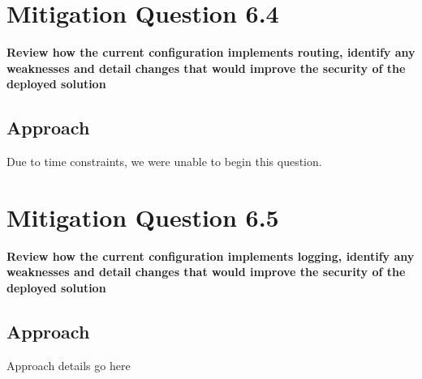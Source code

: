 \section{Mitigation Question 6.4}
\textbf{Review how the current configuration implements routing, identify any
weaknesses and detail changes that would improve the security of the deployed
solution}
\subsection{Approach}
Due to time constraints, we were unable to begin this question.

\section{Mitigation Question 6.5}
\textbf{Review how the current configuration implements logging, identify any
weaknesses and detail changes that would improve the security of the deployed
solution}
\subsection{Approach}
Approach details go here
